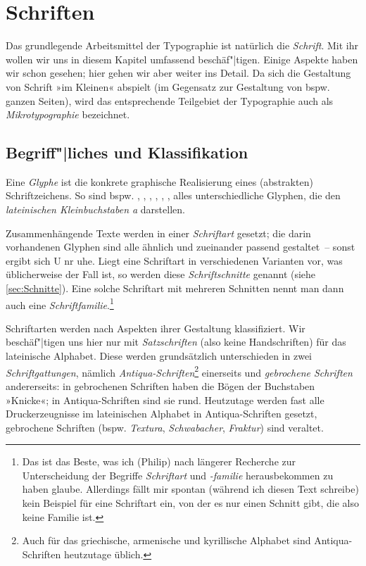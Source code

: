 \chapter{Schriften}
\label{ch:Schriften}

Das grundlegende Arbeitsmittel der Typographie ist natürlich die
\emph{Schrift}.  Mit ihr wollen wir uns in diesem Kapitel umfassend
beschäf"|tigen.  Einige Aspekte haben wir schon gesehen; hier gehen wir
aber weiter ins Detail.  Da sich die Gestaltung von Schrift »im
Kleinen« abspielt (im Gegensatz zur Gestaltung von bspw. ganzen
Seiten), wird das entsprechende Teilgebiet der Typographie auch als
\emph{Mikrotypographie} bezeichnet.

\section{Begriff"|liches und Klassifikation}

Eine \emph{Glyphe} ist die konkrete graphische Realisierung eines
(abstrakten) Schriftzeichens.  So sind bspw. ,
, , ,
, ,  alles
unterschiedliche Glyphen, die den \emph{lateinischen Kleinbuchstaben
  a} darstellen.

Zusammenhängende Texte werden in einer \emph{Schriftart} gesetzt; die
darin vorhandenen Glyphen sind alle ähnlich und zueinander passend
gestaltet~-- sonst ergibt sich {U\selectfont
  n\selectfont r\selectfont
  u\selectfont h\selectfont e}.  Liegt
eine Schriftart in verschiedenen Varianten vor, was üblicherweise der
Fall ist, so werden diese \emph{Schriftschnitte} genannt (siehe
\cref{sec:Schnitte}).  Eine solche Schriftart mit mehreren Schnitten
nennt man dann auch eine \emph{Schriftfamilie}.\footnote{Das ist das
  Beste, was ich (Philip) nach längerer Recherche zur Unterscheidung
  der Begriffe \emph{Schriftart} und \emph{-familie} herausbekommen zu
  haben glaube.  Allerdings fällt mir spontan (während ich diesen Text
  schreibe) kein Beispiel für eine Schriftart ein, von der es nur
  einen Schnitt gibt, die also keine Familie ist.}

Schriftarten werden nach Aspekten ihrer Gestaltung klassifiziert.  Wir
beschäf"|tigen uns hier nur mit \emph{Satzschriften} (also keine
Handschriften) für das lateinische Alphabet.  Diese werden
grundsätzlich unterschieden in zwei \emph{Schriftgattungen}, nämlich
\emph{Antiqua-Schriften}\footnote{Auch für das griechische, armenische
  und kyrillische Alphabet sind Antiqua-Schriften heutzutage üblich.}
einerseits und \emph{gebrochene Schriften} andererseits: in
gebrochenen Schriften haben die Bögen der Buchstaben »Knicke«; in
Antiqua-Schriften sind sie rund.  Heutzutage werden fast alle
Druckerzeugnisse im lateinischen Alphabet in Antiqua-Schriften
gesetzt, gebrochene Schriften (bspw. \emph{Textura},
\emph{Schwabacher}, \emph{Fraktur}) sind veraltet.

